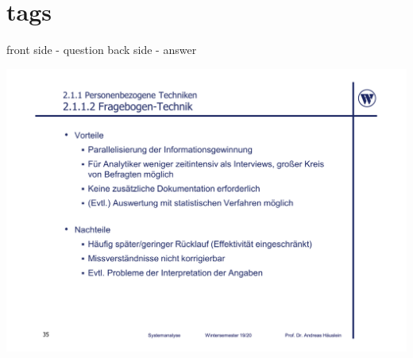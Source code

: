 \documentclass{article}
\begin{document}
\section{tags}

\begin{tcolorbox}[colback=white!10!white,colframe=lightgray!75!black,
  savelowerto=\jobname_ex.tex]
  front side - question
  \tcblower
  back side - answer
	\begin{center}
		\includegraphics[width=\linewidth]{test}
	\end{center}
\end{tcolorbox}


\clearpage

\end{document}
